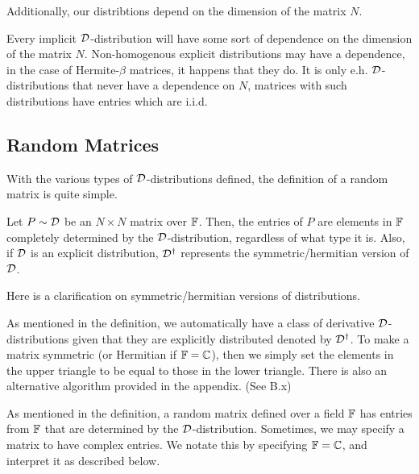 Additionally, our distribtions depend on the dimension of the matrix $N$.

\begin{remark}[Dependence on $N$]
Every implicit $\mathcal{D}$-distribution will have some sort of dependence on the dimension of the matrix $N$.
Non-homogenous explicit distributions may have a dependence, in the case of Hermite-$\beta$ matrices, it happens that they do.
It is only e.h. $\mathcal{D}$-distributions that never have a dependence on $N$, matrices with such distributions have entries which are i.i.d.
\end{remark}


\subsection{Random Matrices}

With the various types of $\mathcal{D}$-distributions defined, the definition of a random matrix is quite simple.

\begin{definition}
Let $P \sim \mathcal{D}$ be an $N \times N$ matrix over $\mathbb{F}$. Then, the entries of $P$ are elements in $\mathbb{F}$ completely determined by the $\mathcal{D}$-distribution, regardless of what type it is.
Also, if $\mathcal{D}$ is an explicit distribution, $\mathcal{D}^\dagger$ represents the symmetric/hermitian version of $\mathcal{D}$.
\end{definition}

Here is a clarification on symmetric/hermitian versions of distributions.

\begin{remark}
As mentioned in the definition, we automatically have a class of derivative $\mathcal{D}$-distributions given that they are explicitly distributed denoted by $\mathcal{D}^\dagger$. To make a matrix symmetric
(or Hermitian if $\mathbb{F} = \mathbb{C}$), then we simply set the elements in the upper triangle to be equal to those in the lower triangle. There is also an alternative algorithm provided in the appendix. (See B.x)
\end{remark}

As mentioned in the definition, a random matrix defined over a field $\mathbb{F}$ has entries from $\mathbb{F}$ that are determined by the $\mathcal{D}$-distribution.
Sometimes, we may specify a matrix to have complex entries. We notate this by specifying $\mathbb{F} = \mathbb{C}$, and interpret it as described below.

